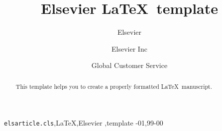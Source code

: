 

%

%










\begin{frontmatter}

\title{Elsevier \LaTeX\ template}

\author{Elsevier}
\address{Radarweg 29, Amsterdam}

\author[mymainaddress,mysecondaryaddress]{Elsevier Inc}

\author[mysecondaryaddress]{Global Customer Service}

\address[mymainaddress]{1600 John F Kennedy Boulevard, Philadelphia}
\address[mysecondaryaddress]{360 Park Avenue South, New York}

\begin{abstract}
This template helps you to create a properly formatted \LaTeX\ manuscript.
\end{abstract}

\begin{keyword}
\texttt{elsarticle.cls}\sep \LaTeX\sep Elsevier \sep template
-01\sep  99-00
\end{keyword}

\end{frontmatter}

